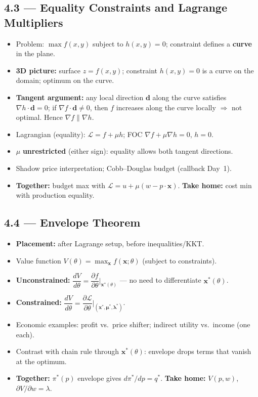 \documentclass[11pt,a4paper]{article}
\begin{document}
\subsection{4.3 --- Equality Constraints and Lagrange Multipliers}
\begin{itemize}[leftmargin=*]
    \item Problem: $\max f(x,y)$ subject to $h(x,y)=0$; constraint defines a \textbf{curve} in the plane.
    \item \textbf{3D picture:} surface $z=f(x,y)$; constraint $h(x,y)=0$ is a curve on the domain;
      optimum on the curve.
    \item \textbf{Tangent argument:} any local direction $\mathbf{d}$ along the curve satisfies
      $\nabla h\cdot\mathbf{d}=0$; if $\nabla f\cdot\mathbf{d}\neq 0$, then $f$ increases along the curve
      locally $\Rightarrow$ not optimal. Hence $\nabla f\parallel\nabla h$.
    \item Lagrangian (equality): $\mathcal{L}=f+\mu h$; FOC $\nabla f+\mu\nabla h=0$, $h=0$.
    \item $\mu$ \textbf{unrestricted} (either sign): equality allows both tangent directions.
    \item Shadow price interpretation; Cobb--Douglas budget (callback Day~1).
    \item \textbf{Together:} budget max with $\mathcal{L}=u+\mu(w-p\cdot\mathbf{x})$.
      \textbf{Take home:} cost min with production equality.
\end{itemize}

\subsection{4.4 --- Envelope Theorem}
\begin{itemize}[leftmargin=*]
    \item \textbf{Placement:} after Lagrange setup, before inequalities/KKT.
    \item Value function $V(\theta)=\max_{\mathbf{x}} f(\mathbf{x};\theta)$ (subject to constraints).
    \item \textbf{Unconstrained:}
      $\dfrac{dV}{d\theta}=\dfrac{\partial f}{\partial\theta}\Big|_{\mathbf{x}^*(\theta)}$
      --- no need to differentiate $\mathbf{x}^*(\theta)$.
    \item \textbf{Constrained:}
      $\dfrac{dV}{d\theta}=\dfrac{\partial \mathcal{L}}{\partial\theta}\Big|_{(\mathbf{x}^*,\boldsymbol{\mu}^*,\boldsymbol{\lambda}^*)}$.
    \item Economic examples: profit vs.\ price shifter; indirect utility vs.\ income (one each).
    \item Contrast with chain rule through $\mathbf{x}^*(\theta)$: envelope drops terms that vanish at the optimum.
    \item \textbf{Together:} $\pi^*(p)$ envelope gives $d\pi^*/dp=q^*$.
      \textbf{Take home:} $V(p,w)$, $\partial V/\partial w=\lambda$.
\end{itemize}
\end{document}
